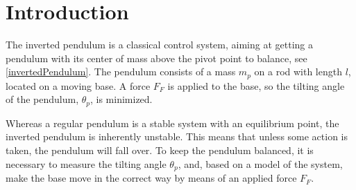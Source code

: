 \chapter{Introduction}

The inverted pendulum is a classical control system, aiming at getting a pendulum with its center of mass above the pivot point to balance, see \autoref{invertedPendulum}. The pendulum consists of a mass $m_p$ on a rod with length $l$, located on a moving base. A force $F_F$ is applied to the base, so the tilting angle of the pendulum, $\theta_p$, is minimized. 

Whereas a regular pendulum is a stable system with an equilibrium point, the inverted pendulum is inherently unstable. This means that unless some action is taken, the pendulum will fall over. To keep the pendulum balanced, it is necessary to measure the tilting angle $
\theta_p$, and, based on a model of the system, make the base move in the correct way by means of an applied force $F_F$.


